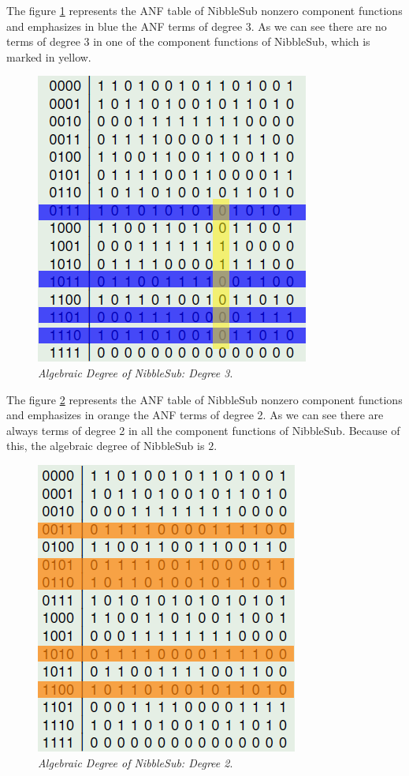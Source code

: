 \begin{example}
The figure \ref{fig:deg2} represents the ANF table of NibbleSub nonzero
component functions and emphasizes in blue the ANF terms of degree 3. As we can see there are no terms of degree 3 in one of the component functions of NibbleSub, which is marked in yellow.

\begin{figure}[htbp!]
\centering
\includegraphics{deg2}
\caption[Algebraic Degree of NibbleSub: Degree 3]{\textit{Algebraic Degree of NibbleSub: Degree 3}.}
\label{fig:deg2}
\end{figure}

The figure \ref{fig:deg3} represents the ANF table of NibbleSub nonzero
component functions and emphasizes in orange the ANF terms of degree 2. As we can see there are always terms of degree 2 in all the component functions of NibbleSub. Because of this, the algebraic degree of NibbleSub is $2$.

\begin{figure}[htbp!]
\centering
\includegraphics{deg3}
\caption[Algebraic Degree of NibbleSub: Degree 2]{\textit{Algebraic Degree of NibbleSub: Degree 2}.}
\label{fig:deg3}
\end{figure}

\end{example}

